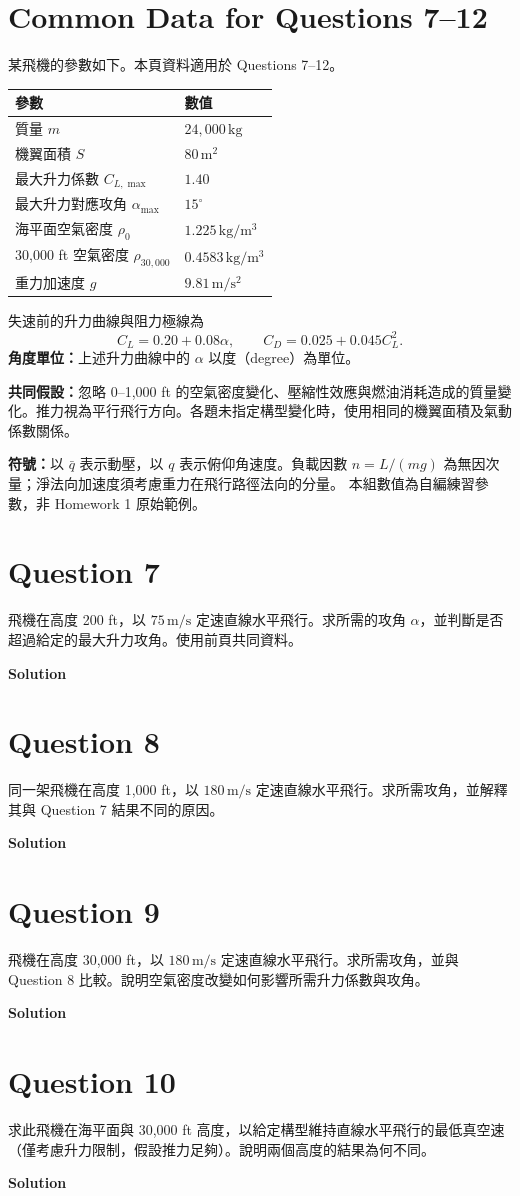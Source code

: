 \documentclass[12pt,a4paper]{article}
\newcommand{\question}[1]{\section*{Question #1}}
\newcommand{\solution}{\par\medskip\textbf{Solution}\par}
\begin{document}
\section*{Common Data for Questions 7--12}
某飛機的參數如下。本頁資料適用於 Questions 7--12。
\begin{center}
\renewcommand{\arraystretch}{1.45}
\begin{tabular}{ll}
\toprule
參數 & 數值\\
\midrule
質量 $m$ & $24{,}000\,\mathrm{kg}$\\
機翼面積 $S$ & $80\,\mathrm{m^2}$\\
最大升力係數 $C_{L,\max}$ & $1.40$\\
最大升力對應攻角 $\alpha_{\max}$ & $15^\circ$\\
海平面空氣密度 $\rho_0$ & $1.225\,\mathrm{kg/m^3}$\\
30,000 ft 空氣密度 $\rho_{30,000}$ & $0.4583\,\mathrm{kg/m^3}$\\
重力加速度 $g$ & $9.81\,\mathrm{m/s^2}$\\
\bottomrule
\end{tabular}
\end{center}
失速前的升力曲線與阻力極線為
\[
 C_L=0.20+0.08\alpha,\qquad C_D=0.025+0.045C_L^2.
\]
\textbf{角度單位：}上述升力曲線中的 $\alpha$ 以度（degree）為單位。

\textbf{共同假設：}忽略 0--1,000 ft 的空氣密度變化、壓縮性效應與燃油消耗造成的質量變化。推力視為平行飛行方向。各題未指定構型變化時，使用相同的機翼面積及氣動係數關係。

\textbf{符號：}以 $\bar q$ 表示動壓，以 $q$ 表示俯仰角速度。負載因數 $n=L/(mg)$ 為無因次量；淨法向加速度須考慮重力在飛行路徑法向的分量。
\vfill
{\small 本組數值為自編練習參數，非 Homework 1 原始範例。}
\newpage

\question{7}
飛機在高度 200 ft，以 $75\,\mathrm{m/s}$ 定速直線水平飛行。求所需的攻角 $\alpha$，並判斷是否超過給定的最大升力攻角。使用前頁共同資料。
\solution
\vfill
\question{8}
同一架飛機在高度 1,000 ft，以 $180\,\mathrm{m/s}$ 定速直線水平飛行。求所需攻角，並解釋其與 Question 7 結果不同的原因。
\solution
\vfill
\newpage

\question{9}
飛機在高度 30,000 ft，以 $180\,\mathrm{m/s}$ 定速直線水平飛行。求所需攻角，並與 Question 8 比較。說明空氣密度改變如何影響所需升力係數與攻角。
\solution
\vfill
\question{10}
求此飛機在海平面與 30,000 ft 高度，以給定構型維持直線水平飛行的最低真空速（僅考慮升力限制，假設推力足夠）。說明兩個高度的結果為何不同。
\solution
\vfill
\newpage
\end{document}
